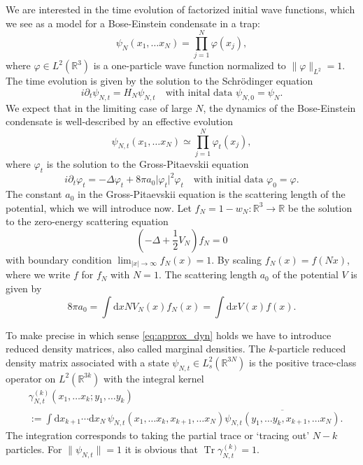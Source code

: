 \documentclass[11pt,a4paper,DIV11]{scrartcl}	%
\newcommand{\di}{\textrm{d}}		%
\newcommand{\cc}[1]{\overline{#1}}	%
\newcommand{\Rbb}{\mathbb{R}}		%
\newcommand{\norm}[1]{\lVert#1\rVert}	%
\newcommand{\Tr}{\operatorname{Tr}}	%
\newcommand{\be}[1]{\begin{equation}\label{eq:#1}}	%
\newcommand{\ee}{\end{equation}}
\newcommand{\bd}{\begin{displaymath}}			%
\newcommand{\ed}{\end{displaymath}}
\newcommand{\eqr}[1]{\eqref{eq:#1}}			%
\begin{document}
We are interested in the time evolution of factorized initial wave functions, which we see as a model for a Bose-Einstein condensate in a trap:
\bd
\psi_N(x_1,\ldots x_N) = \prod_{j=1}^N \varphi(x_j),
\ed
where $\varphi \in L^2(\Rbb^3)$ is a one-particle wave function normalized to $\norm{\varphi}_{L^2} = 1$. The time evolution is given by the solution to the Schr\"odinger equation 
\bd
i \partial_t \psi_{N,t} = H_N \psi_{N,t}\quad \mbox{with inital data } \psi_{N,0} = \psi_N.
\ed
We expect that in the limiting case of large $N$, the dynamics of the
Bose-Einstein condensate is well-described by an effective evolution
\be{approx_dyn}
\psi_{N,t}(x_1,\ldots x_N) \simeq \prod_{j=1}^N \varphi_t(x_j),
\ee
where $\varphi_t$ is the solution to the Gross-Pitaevskii equation
\be{gp}
i \partial_t \varphi_t = - \Delta \varphi_t + 8\pi a_0 \lvert \varphi_t\rvert^2 \varphi_t\quad \mbox{with initial data } \varphi_0 = \varphi.
\ee
The constant $a_0$ in the Gross-Pitaevskii equation is the scattering length of the potential, which we will introduce now.
Let $f_N = 1 - w_N: \Rbb^3 \to \Rbb$ be the solution to the zero-energy scattering equation
\begin{equation}
\label{eq:scatt}
\left(-\Delta + \frac{1}{2}V_N \right) f_N = 0
\end{equation}
with boundary condition $\lim_{\lvert x\rvert \to \infty} f_N(x) = 1$. By scaling $f_N(x) = f(Nx)$, where we write $f$ for $f_N$ with $N=1$. The scattering length $a_0$ of the potential $V$ is given by
\bd
8\pi a_0 = \int \di x NV_N(x)f_N(x) = \int \di x V(x)f(x).
\ed

To make precise in which sense \eqr{approx_dyn} holds we have to introduce reduced density matrices, also called marginal densities.
The $k$-particle reduced density matrix associated with a state $\psi_{N,t} \in L^2_s(\Rbb^{3N})$ is the positive trace-class operator on $L^2(\Rbb^{3k})$ with the integral kernel
\be{red_density}
\begin{split}
& \gamma_{N,t}^{(k)}(x_1,\ldots x_k;y_1,\ldots y_k) \\
&  := \int \di x_{k+1} \cdots \di x_N\,\psi_{N,t}(x_1,\ldots x_k,x_{k+1},\ldots x_N) \cc{\psi_{N,t}(y_1,\ldots y_k,x_{k+1},\ldots x_N)}.
\end{split}
\ee
The integration corresponds to taking the partial trace or `tracing out' $N-k$ particles. For $\norm{\psi_{N,t}} = 1$ it is obvious that $\Tr \gamma_{N,t}^{(k)} = 1$.
\end{document}
